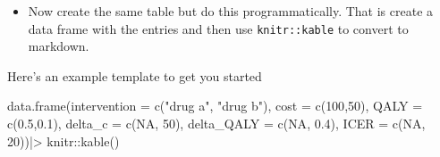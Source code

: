\documentclass[
]{article}
\newenvironment{Shaded}{\begin{snugshade}}{\end{snugshade}}
\newcommand{\AttributeTok}[1]{\textcolor[rgb]{0.77,0.63,0.00}{#1}}
\newcommand{\ConstantTok}[1]{\textcolor[rgb]{0.00,0.00,0.00}{#1}}
\newcommand{\DecValTok}[1]{\textcolor[rgb]{0.00,0.00,0.81}{#1}}
\newcommand{\FloatTok}[1]{\textcolor[rgb]{0.00,0.00,0.81}{#1}}
\newcommand{\FunctionTok}[1]{\textcolor[rgb]{0.00,0.00,0.00}{#1}}
\newcommand{\NormalTok}[1]{#1}
\newcommand{\SpecialCharTok}[1]{\textcolor[rgb]{0.00,0.00,0.00}{#1}}
\newcommand{\StringTok}[1]{\textcolor[rgb]{0.31,0.60,0.02}{#1}}
\providecommand{\tightlist}{%
  \setlength{\itemsep}{0pt}\setlength{\parskip}{0pt}}
\begin{document}
\begin{itemize}
\tightlist
\item
  Now create the same table but do this programmatically. That is create
  a data frame with the entries and then use \texttt{knitr::kable} to
  convert to markdown.
\end{itemize}

Here's an example template to get you started

\begin{Shaded}
\begin{Highlighting}[]
\FunctionTok{data.frame}\NormalTok{(}\AttributeTok{intervention =} \FunctionTok{c}\NormalTok{(}\StringTok{"drug a"}\NormalTok{, }\StringTok{"drug b"}\NormalTok{),}
           \AttributeTok{cost =} \FunctionTok{c}\NormalTok{(}\DecValTok{100}\NormalTok{,}\DecValTok{50}\NormalTok{),}
           \AttributeTok{QALY =} \FunctionTok{c}\NormalTok{(}\FloatTok{0.5}\NormalTok{,}\FloatTok{0.1}\NormalTok{),}
           \AttributeTok{delta\_c =} \FunctionTok{c}\NormalTok{(}\ConstantTok{NA}\NormalTok{, }\DecValTok{50}\NormalTok{),}
           \AttributeTok{delta\_QALY =} \FunctionTok{c}\NormalTok{(}\ConstantTok{NA}\NormalTok{, }\FloatTok{0.4}\NormalTok{),}
           \AttributeTok{ICER =} \FunctionTok{c}\NormalTok{(}\ConstantTok{NA}\NormalTok{, }\DecValTok{20}\NormalTok{))}\SpecialCharTok{|\textgreater{}} 
\NormalTok{knitr}\SpecialCharTok{::}\FunctionTok{kable}\NormalTok{()}
\end{Highlighting}
\end{Shaded}
\end{document}
